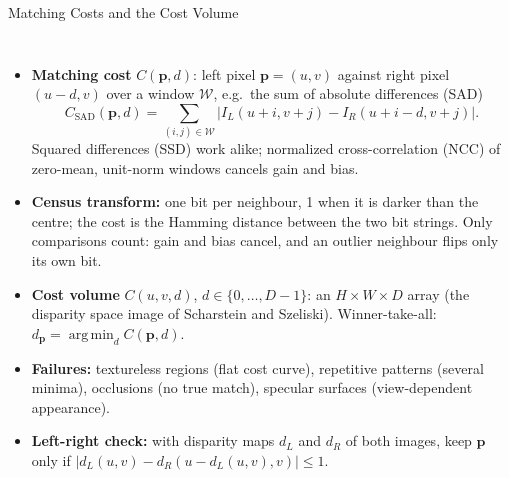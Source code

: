 \begin{frame}{Matching Costs and the Cost Volume}
  \begin{columns}[T,onlytextwidth]
      \begin{itemize}\scriptsize\itemsep0.12em
        \item \textbf{Matching cost} $C(\mathbf{p},d)$: left pixel $\mathbf{p}=(u,v)$ against right pixel $(u-d,v)$ over a window $\mathcal{W}$, e.g.\ the sum of absolute differences (SAD)
        \[ C_{\mathrm{SAD}}(\mathbf{p},d) = \textstyle\sum_{(i,j)\in \mathcal{W}} \big|I_L(u{+}i,v{+}j) - I_R(u{+}i{-}d,v{+}j)\big| . \]
        Squared differences (SSD) work alike; normalized cross-correlation (NCC) of zero-mean, unit-norm windows cancels gain and bias.
        \item \textbf{Census transform:} one bit per neighbour, 1 when it is darker than the centre; the cost is the Hamming distance between the two bit strings. Only comparisons count: gain and bias cancel, and an outlier neighbour flips only its own bit.
        \item \textbf{Cost volume} $C(u,v,d)$, $d \in \{0,\dots,D-1\}$: an $H\times W\times D$ array (the disparity space image of Scharstein and Szeliski). Winner-take-all: $d_{\mathbf{p}} = \operatorname*{arg\,min}_d C(\mathbf{p},d)$.
        \item \textbf{Failures:} textureless regions (flat cost curve), repetitive patterns (several minima), occlusions (no true match), specular surfaces (view-dependent appearance).
        \item \textbf{Left-right check:} with disparity maps $d_L$ and $d_R$ of both images, keep $\mathbf{p}$ only if $|d_L(u,v) - d_R(u - d_L(u,v), v)| \leq 1$.
      \end{itemize}
      \centering
\end{columns}
\end{frame}
